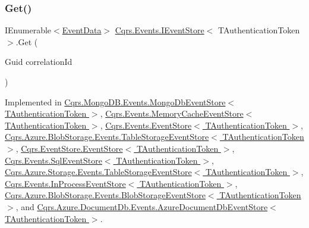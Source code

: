 \subsubsection{\texorpdfstring{Get()}{Get()}\hspace{0.1cm}{\footnotesize\ttfamily [2/2]}}
{\footnotesize\ttfamily I\+Enumerable$<$\hyperlink{classCqrs_1_1Events_1_1EventData}{Event\+Data}$>$ \hyperlink{interfaceCqrs_1_1Events_1_1IEventStore}{Cqrs.\+Events.\+I\+Event\+Store}$<$ T\+Authentication\+Token $>$.Get (\begin{DoxyParamCaption}\item[{Guid}]{correlation\+Id }\end{DoxyParamCaption})}



Implemented in \hyperlink{classCqrs_1_1MongoDB_1_1Events_1_1MongoDbEventStore_ac886ca0a57ad86cb99ef0a3767db9280_ac886ca0a57ad86cb99ef0a3767db9280}{Cqrs.\+Mongo\+D\+B.\+Events.\+Mongo\+Db\+Event\+Store$<$ T\+Authentication\+Token $>$}, \hyperlink{classCqrs_1_1Events_1_1MemoryCacheEventStore_a2a93a3f10423f608527fbc41a7ce8cef_a2a93a3f10423f608527fbc41a7ce8cef}{Cqrs.\+Events.\+Memory\+Cache\+Event\+Store$<$ T\+Authentication\+Token $>$}, \hyperlink{classCqrs_1_1Events_1_1EventStore_a0096646f5dff730b0041b9469719c420_a0096646f5dff730b0041b9469719c420}{Cqrs.\+Events.\+Event\+Store$<$ T\+Authentication\+Token $>$}, \hyperlink{classCqrs_1_1Azure_1_1BlobStorage_1_1Events_1_1TableStorageEventStore_a9b952a9257dc6f458b98eba87684412e_a9b952a9257dc6f458b98eba87684412e}{Cqrs.\+Azure.\+Blob\+Storage.\+Events.\+Table\+Storage\+Event\+Store$<$ T\+Authentication\+Token $>$}, \hyperlink{classCqrs_1_1EventStore_1_1EventStore_a898b51899af27db8aa0fb0c0dc75b25d_a898b51899af27db8aa0fb0c0dc75b25d}{Cqrs.\+Event\+Store.\+Event\+Store$<$ T\+Authentication\+Token $>$}, \hyperlink{classCqrs_1_1Events_1_1SqlEventStore_ac1fb2bdec07cbeec57fb3d985e7a8b31_ac1fb2bdec07cbeec57fb3d985e7a8b31}{Cqrs.\+Events.\+Sql\+Event\+Store$<$ T\+Authentication\+Token $>$}, \hyperlink{classCqrs_1_1Azure_1_1Storage_1_1Events_1_1TableStorageEventStore_a1b436bbb111b14b85ee6ba7f90fb1a35_a1b436bbb111b14b85ee6ba7f90fb1a35}{Cqrs.\+Azure.\+Storage.\+Events.\+Table\+Storage\+Event\+Store$<$ T\+Authentication\+Token $>$}, \hyperlink{classCqrs_1_1Events_1_1InProcessEventStore_aeff2bd8064eb4a1501d723e2aa9f8cfd_aeff2bd8064eb4a1501d723e2aa9f8cfd}{Cqrs.\+Events.\+In\+Process\+Event\+Store$<$ T\+Authentication\+Token $>$}, \hyperlink{classCqrs_1_1Azure_1_1BlobStorage_1_1Events_1_1BlobStorageEventStore_a660c786205693ee34a11e205c6d136ad_a660c786205693ee34a11e205c6d136ad}{Cqrs.\+Azure.\+Blob\+Storage.\+Events.\+Blob\+Storage\+Event\+Store$<$ T\+Authentication\+Token $>$}, and \hyperlink{classCqrs_1_1Azure_1_1DocumentDb_1_1Events_1_1AzureDocumentDbEventStore_ac59ce599b768ce047869b8ac135f4e22_ac59ce599b768ce047869b8ac135f4e22}{Cqrs.\+Azure.\+Document\+Db.\+Events.\+Azure\+Document\+Db\+Event\+Store$<$ T\+Authentication\+Token $>$}.

